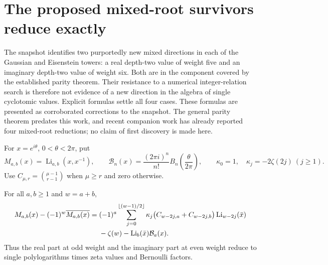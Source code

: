 
\section{The proposed mixed-root survivors reduce exactly}
\label{sec:mixed-parity-correction}

The snapshot identifies two purportedly new mixed directions in each of
the Gaussian and Eisenstein towers: a real depth-two value of weight five
and an imaginary depth-two value of weight six. Both are in the component
covered by the established parity theorem. Their resistance to a numerical
integer-relation search is therefore not evidence of a new direction in
the algebra of single cyclotomic values. Explicit formulas settle all four
cases. These formulas are presented as corroborated corrections to the
snapshot. The general parity theorem predates this work, and recent
companion work has already reported four mixed-root reductions; no claim
of first discovery is made here.

For $x=e^{i\theta}$, $0<\theta<2\pi$, put
\[
 M_{a,b}(x)=\operatorname{Li}_{a,b}(x,x^{-1}),\qquad
 \mathcal B_n(x)=\frac{(2\pi i)^n}{n!}B_n\!\left(\frac{\theta}{2\pi}\right),
 \qquad
 \kappa_0=1,\quad\kappa_j=-2\zeta(2j)\ (j\ge1).
\]
Use $C_{\mu,r}=\binom{\mu-1}{r-1}$ when $\mu\ge r$ and zero otherwise.

\begin{theorem}
\label{thm:inverse-color}
For all $a,b\ge1$ and $w=a+b$,
\begin{align}
 M_{a,b}(x)-(-1)^w\overline{M_{a,b}(x)}
 ={}&(-1)^a\sum_{j=0}^{\lfloor(w-1)/2\rfloor}
 \kappa_j\bigl(C_{w-2j,a}+C_{w-2j,b}\bigr)
 \operatorname{Li}_{w-2j}(\bar x)\label{eq:inverse-color}\\
 &-\zeta(w)-\operatorname{Li}_b(\bar x)\mathcal B_a(x).\notag
\end{align}
Thus the real part at odd weight and the imaginary part at even weight
reduce to single polylogarithms times zeta values and Bernoulli factors.
\end{theorem}

